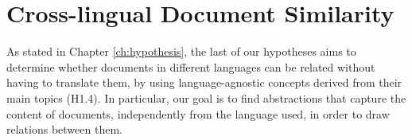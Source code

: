 

\chapter{Cross-lingual Document Similarity}\label{ch:multilinguality}

\graphicspath{{multilinguality/figures/}}



As stated in Chapter \ref{ch:hypothesis}, the last of our hypotheses aims to determine whether documents in different languages can be related without having to translate them, by using language-agnostic concepts derived from their main topics (H1.4). In particular, our goal is to find abstractions that capture the content of documents, independently from the language used, in order to draw relations between them. 


